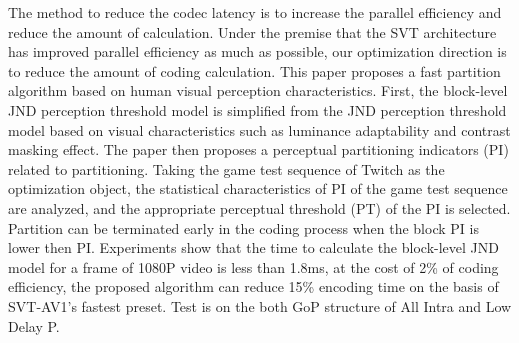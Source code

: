 \begin{enabstract}
  The method to reduce the codec latency is to increase the parallel efficiency and reduce the amount of calculation. Under the premise that the SVT architecture has improved parallel efficiency as much as possible, our optimization direction is to reduce the amount of coding calculation. This paper proposes a fast partition algorithm based on human visual perception characteristics. First, the block-level JND perception threshold model is simplified from the JND perception threshold model based on visual characteristics such as luminance adaptability and contrast masking effect. The paper then proposes a perceptual partitioning indicators (PI) related to partitioning. Taking the game test sequence of Twitch as the optimization object, the statistical characteristics of PI of the game test sequence are analyzed, and the appropriate perceptual threshold (PT) of the PI is selected. Partition can be  terminated early in the coding process when the block PI is lower then PI. Experiments show that the time to calculate the block-level JND model for a frame of 1080P video is less than 1.8ms, at the cost of 2\% of coding efficiency, the proposed algorithm can reduce 15\% encoding time on the basis of SVT-AV1's fastest preset. Test is on the both GoP structure of All Intra and Low Delay P.
\end{enabstract}
